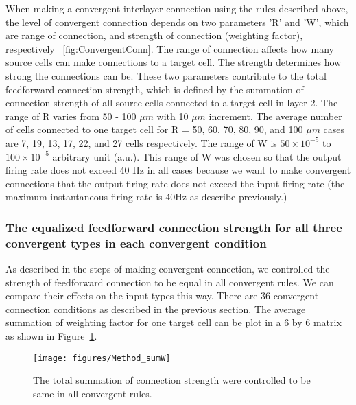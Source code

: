 When making a convergent interlayer connection using the rules described above, the level of convergent connection depends on two parameters 'R' and 'W', which are range of connection, and strength of connection (weighting factor), respectively ~\ref{fig:ConvergentConn}. The range of connection affects how many source cells can make connections to a target cell. The strength determines how strong the connections can be. These two parameters contribute to the total feedforward connection strength, which is defined by the summation of connection strength of all source cells connected to a target cell in layer 2. The range of R varies from 50 - 100 $\mu m$ with 10 $\mu m$ increment. The average number of cells connected to one target cell for R = 50, 60, 70, 80, 90, and 100 $\mu m$ cases are 7, 19, 13, 17, 22, and 27 cells respectively. The range of W is $50\times10^{-5} $ to $ 100\times10^{-5}$ arbitrary unit (a.u.). This range of W was chosen so that the output firing rate does not exceed 40 Hz in all cases because we want to make convergent connections that the output firing rate does not exceed the input firing rate (the maximum instantaneous firing rate is 40Hz as describe previously.) 




\subsubsection[The equalized feedforward connection]{The equalized feedforward connection strength for all three convergent types in each convergent condition}
As described in the steps of making convergent connection, we controlled the strength of feedforward connection to be equal in all convergent rules. We can compare their effects on the input types this way. There are 36 convergent connection conditions as described in the previous section. The average summation of weighting factor for one target cell can be plot in a 6 by 6 matrix as shown in Figure~\ref{fig:ConSumW}.
\begin{figure}
	\centering
	\texttt{[image: figures/Method\_sumW]}
	\caption[The total summation of connection strength]{The total summation of connection strength were controlled to be same in all convergent rules.}
	\label{fig:ConSumW}
\end{figure}

%


